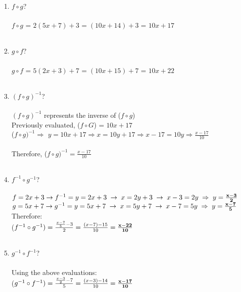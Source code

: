 \documentclass{amsart}
\theoremstyle{definition}
\theoremstyle{Exercise}
\theoremstyle{remark}
\theoremstyle{rule}
\numberwithin{equation}{section}
\begin{document}
\begin{enumerate}[label=(\alph*)]
\item  $f\circ g$?\\\\
$f\circ g$ = $2(5x+7)+3$ = $(10x+14)+3$ = $10x + 17$
\\\\
\item  $g \circ f$?\\\\
$g \circ f$ = $5(2x+3) + 7$ = $(10x+15) + 7$ = $10x+22$
\\\\
\item  $(f\circ g)^{-1}$?\\\\
$(f \circ g)^{-1}$ represents the inverse of ($f \circ g$)\\
Previously evaluated, ($f \circ G$) = $10x+17$\\
($f \circ g)^{-1} \Rightarrow$\; $y = 10x+17 \Rightarrow x = 10y+17 \Rightarrow x-17 = 10y \Rightarrow \frac{x-17}{10}$
\\\\
Therefore, ($f \circ g)^{-1} = \frac{x-17}{10}$ 
\\\\
\item  $f^{-1}\circ g^{-1}$?\\\\
$f = 2x+3 \rightarrow\\
f^{-1} = y=2x+3\; \rightarrow\; x=2y+3\; \rightarrow\; x-3=2y\; \Rightarrow\; y=\bf{\frac{x-3}{2}}$\\
$g = 5x+7 \rightarrow\\
g^{-1} = y=5x+7\; \rightarrow\; x=5y+7\; \rightarrow\; x-7=5y\; \Rightarrow\; y=\bf{\frac{x-7}{5}}$\\
Therefore:\\
($f^{-1} \circ g^{-1}) = \frac{\frac{x-7}{5}-3}{2} = \frac{(x-7)-15}{10} = \bf{\frac{x-22}{10}}$
\\\\
\item  $g^{-1}\circ f^{-1}$?\\\\
Using the above evaluations:\\
($g^{-1} \circ f^{-1}) = \frac{\frac{x-3}{2}-7}{5} = \frac{(x-3)-14}{10} = \bf{\frac{x-17}{10}}$
\\\\
\end{enumerate}
\end{document}
